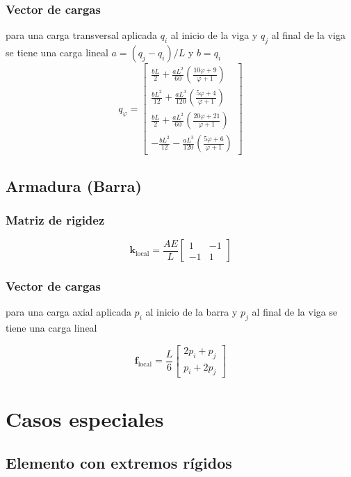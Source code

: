 \subsubsection{Vector de cargas}
para una carga transversal aplicada $q_i$ al inicio de la viga y $q_j$ al final de la viga se tiene una carga lineal
$a = (q_j-q_i)/L$ y $b=q_i$
\begin{equation}q_{\varphi}=\begin{bmatrix}\frac{bL}{2}+\frac{aL^{2}}{60}\left(\frac{10\varphi+9}{\varphi+1}\right)\\\frac{bL^{2}}{12}+\frac{aL^{3}}{120}\left(\frac{5\varphi+4}{\varphi+1}\right)\\\frac{bL}{2}+\frac{aL^{2}}{60}\left(\frac{20\varphi+21}{\varphi+1}\right)\\-\frac{bL^{2}}{12}-\frac{aL^{3}}{120}\left(\frac{5\varphi+6}{\varphi+1}\right)\end{bmatrix}\end{equation}

\subsection{Armadura (Barra)}
\subsubsection{Matriz de rigidez}
\[
\mathbf{k}_{\text{local}}=\frac{AE}{L}
\begin{bmatrix}
1 & -1\\[4pt]
-1 & 1
\end{bmatrix}
\]
\subsubsection{Vector de cargas}
para una carga axial aplicada $p_i$ al inicio de la barra y $p_j$ al final de la viga se tiene una carga lineal

\[
\mathbf{f}_{\text{local}} =
\frac{L}{6}
\begin{bmatrix}
2p_i + p_j\\[6pt]
p_i + 2p_j
\end{bmatrix}
\]

\section{Casos especiales}
\subsection{Elemento con extremos rígidos}
